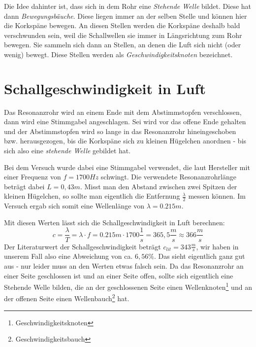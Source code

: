 Die Idee dahinter ist, dass sich in dem Rohr eine \textit{Stehende Welle} bildet. Diese hat dann \textit{Bewegungsbäuche}. Diese liegen immer an der selben Stelle und können hier die Korkspäne bewegen. An diesen Stellen werden die Korkspäne deshalb bald verschwunden sein, weil die Schallwellen sie immer in Längsrichtung zum Rohr bewegen. Sie sammeln sich dann an Stellen, an denen die Luft sich nicht (oder wenig) bewegt. Diese Stellen werden als \textit{Geschwindigkeitsknoten} bezeichnet.




		\section{Schallgeschwindigkeit in Luft}
		\label{kap:c_luft}



Das Resonanzrohr wird an einem Ende mit dem Abstimmstopfen verschlossen, dann wird eine Stimmgabel angeschlagen. Sei wird vor das offene Ende gehalten und der Abstimmstopfen wird so lange in das Resonanzrohr hineingeschoben bzw. herausgezogen, bis die Korkspäne sich zu kleinen Hügelchen anordnen - bis sich also eine \textit{stehende Welle} gebildet hat.

Bei dem Versuch wurde dabei eine Stimmgabel verwendet, die laut Hersteller mit einer Frequenz von \(f = 1700 Hz\) schwingt. Die verwendete Resonanzrohrlänge beträgt dabei \(L = 0,43m\). Misst man den Abstand zwischen zwei Spitzen der kleinen Hügelchen, so sollte man eigentlich die Entfernung \(\frac{\lambda}{2}\) messen können. Im Versuch ergab sich somit eine Wellenlänge von \(\lambda = 0.215m\).

Mit diesen Werten lässt sich die Schallgeschwindigkeit in Luft berechnen:
\begin{equation}
	c = \frac{\lambda}{T} = \lambda \cdot f = 0.215m \cdot 1700\frac{1}{s} = 365,5 \frac{m}{s} \approx 366 \frac{m}{s}
	\label{c_luft}
\end{equation}
Der Literaturwert der Schallgeschwindigkeit beträgt \(c_{lit} = 343 \frac{m}{s}\), wir haben in unserem Fall also eine Abweichung von ca. \(6,56\%\). Das sieht eigentlich ganz gut aus - nur leider muss an den Werten etwas falsch sein. Da das Resonanzrohr an einer Seite geschlossen ist und an einer Seite offen, sollte sich eigentlich eine Stehende Welle bilden, die an der geschlossenen Seite einen Wellenknoten\footnote{Geschwindigkeitsknoten} und an der offenen Seite einen Wellenbauch\footnote{Geschwindigkeitsbauch} hat.

